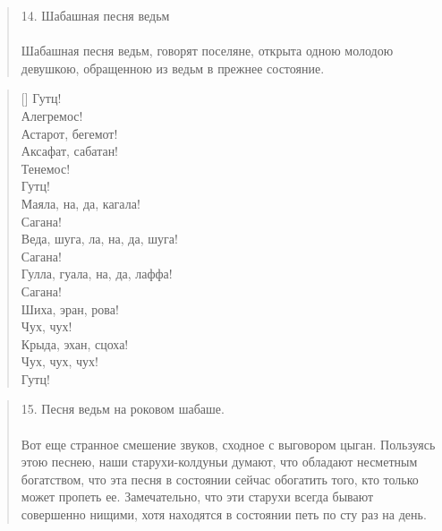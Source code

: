 \begin{quotation}
14. Шабашная песня ведьм\\
\\
Шабашная песня ведьм, говорят поселяне, открыта одною молодою девушкою, обращенною из ведьм в прежнее состояние.
\end{quotation}

\settowidth{\versewidth}{Веда, шуга, ла, на, да, шуга!} 
\begin{verse}[\versewidth]
Гутц!\\
Алегремос!\\
Астарот, бегемот!\\
Аксафат, сабатан!\\
Тенемос!\\
Гутц!\\
Маяла, на, да, кагала!\\
Сагана!\\
Веда, шуга, ла, на, да, шуга!\\
Сагана!\\
Гулла, гуала, на, да, лаффа!\\
Сагана!\\
Шиха, эран, рова!\\
Чух, чух!\\
Крыда, эхан, сцоха!\\
Чух, чух, чух!\\
Гутц!
\end{verse}

\begin{quotation}
15. Песня ведьм на роковом шабаше.\\
\\
Вот еще странное смешение звуков, сходное с выговором цыган. Пользуясь этою песнею, наши старухи-колдуньи думают, что обладают несметным богатством, что эта песня в состоянии сейчас обогатить того, кто только может пропеть ее. Замечательно, что эти старухи всегда бывают совершенно нищими, хотя находятся в состоянии петь по сту раз на день.
\end{quotation}

